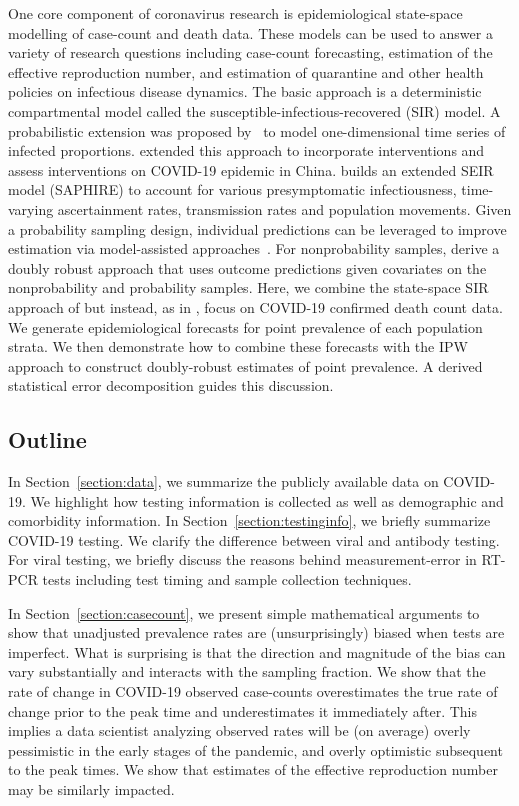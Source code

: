 \documentclass[12pt]{amsart}
\numberwithin{equation}{section}
\theoremstyle{plain}
\begin{document}
One core component of coronavirus research is epidemiological state-space modelling of case-count and death data. These models can be used to answer a variety of research questions including case-count forecasting, estimation of the effective reproduction number, and estimation of quarantine and other health policies on infectious disease dynamics.  The basic approach is a deterministic compartmental model called the susceptible-infectious-recovered (SIR) model.  A probabilistic extension was proposed by~\cite{Osthus2017} to model one-dimensional time series of infected proportions. \cite{Song2020} extended this approach to incorporate interventions and assess interventions on COVID-19 epidemic in China. \cite{Hao2020} builds an extended SEIR model (SAPHIRE) to account for various presymptomatic infectiousness, time-varying ascertainment rates, transmission rates and population movements. Given a probability sampling design, individual predictions can be leveraged to improve estimation via model-assisted approaches~\citep{Breidt2017}.  For nonprobability samples, \cite{Chen2019} derive a doubly robust approach that uses outcome predictions given covariates on the nonprobability and probability samples.  Here, we combine the state-space SIR approach of \cite{Song2020} but instead, as in \cite{Johndrow2020}, focus on COVID-19 confirmed death count data.  We generate epidemiological forecasts for point prevalence of each population strata.  We then demonstrate how to combine these forecasts with the IPW approach to construct doubly-robust estimates of point prevalence.  A derived statistical error decomposition guides this discussion.


\subsection{Outline}

In Section~\ref{section:data}, we summarize the publicly available data on COVID-19.  We highlight how testing information is collected as well as demographic and comorbidity information.  In Section~\ref{section:testinginfo}, we briefly summarize COVID-19 testing.  We clarify the difference between viral and antibody testing.  For viral testing, we briefly discuss the reasons behind measurement-error in RT-PCR tests including test timing and sample collection techniques.

In Section~\ref{section:casecount}, we present simple mathematical arguments to show that unadjusted prevalence rates are (unsurprisingly) biased when tests are imperfect. What is surprising is that the direction and magnitude of the bias can vary substantially and interacts with the sampling fraction.  We show that the rate of change in COVID-19 observed case-counts overestimates the true rate of change prior to the peak time and underestimates it immediately after.  This implies a data scientist analyzing observed rates will be (on average) overly pessimistic in the early stages of the pandemic, and overly optimistic subsequent to the peak times.  We show that estimates of the effective reproduction number may be similarly impacted.
\end{document}
